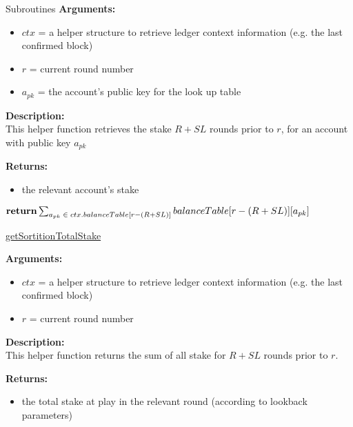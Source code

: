 \documentclass[10pt,a4paper]{article}
\begin{document}
\begin{section}{Subroutines}
\noindent \textbf{Arguments:}
\begin{itemize}
    \item $ctx$ = a helper structure to retrieve ledger context information (e.g. the last confirmed block)
    \item $r$ = current round number
    \item $a_{pk}$ = the account's public key for the look up table
  \end{itemize}


\noindent \textbf{Description:}\\
This helper function retrieves the stake $R + SL$ rounds prior to $r$, for an account
with public key $a_{pk}$

\noindent \textbf{Returns:}
\begin{itemize}
    \item the relevant account's stake
  \end{itemize}




\begin{algorithm}[H]
    \begin{algorithmic}[1]
        
        $\Return \sum_{a_{pk}\;\in\;ctx.balanceTable[r - (R + SL)]}{balanceTable[r - (R + SL)][a_{pk}]}$

        \EndFunction
    \end{algorithmic}
    \caption{\underline{getSortitionTotalStake}}
\end{algorithm}

\noindent \textbf{Arguments:}
\begin{itemize}
    \item $ctx$ = a helper structure to retrieve ledger context information (e.g. the last confirmed block)
    \item $r$ = current round number
  \end{itemize}


\noindent \textbf{Description:}\\
This helper function returns the sum of all stake for $R + SL$ rounds prior to $r$.

\noindent \textbf{Returns:}
\begin{itemize}
    \item the total stake at play in the relevant round (according to lookback parameters)
  \end{itemize}


\end{section}
\end{document}
